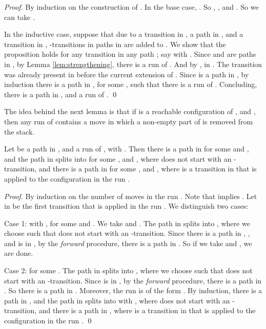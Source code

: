 \documentclass{llncs}
\begin{document}
\begin{proof}
By induction on the construction of .
In the base case, . So , ,  and .
So we can take .

In the inductive case, suppose that due to a transition  in , a path  in ,
and a transition  in ,
-transitions in paths  in  are added to .
We show that the proposition holds for any transition  in any path ;
say  with .
Since  and  are paths in , by Lemma \ref{lem:strengthening},
there is a run  of . And by ,  in .
The transition  was already present in  before the current extension of .
Since  is a path in , by induction there is a path  in , for some ,
such that there is a run  of .
Concluding, there is a path  in ,
and a run  of .
\qed
\end{proof}

The idea behind the next lemma is that if  is a reachable configuration of ,
and , then any run  of  contains a move
 in which a non-empty part  of  is removed from the stack.

\begin{lemma}
\label{lem:nfa3}
Let  be a path in , and
 a run of , with .
Then there is a path  in  for some  and , and
the path  in  splits into
 for some ,  and ,
where  does not start with an -transition, and
there is a path  in  for some ,  and ,
where  is a transition in 
that is applied to the configuration  in the run .
\end{lemma}

\begin{proof}
By induction on the number of moves in the run .
Note that  implies . Let  in 
be the first transition that is applied in the run . We distinguish two cases:

\vspace{1mm}

\noindent
{\sc Case 1}:  with , for some  and .
We take  and . The path  in  splits into
, where we choose  such that
 does not start with an -transition.
Since there is a path  in , ,
and  is in , by the {\em forward} procedure, there is a path  in .
So if we take  and , we are done.

\vspace{1mm}

\noindent
{\sc Case 2}:  for some . The path  in 
splits into , where we choose  such that
 does not start with an -transition.
Since  is in , by the {\em forward} procedure, there is a path  in .
So there is a path  in .
Moreover, the run  is of the form
.
By induction, there is a path  in ,
and the path  in  splits into 
with ,
where  does not start with an -transition, and
there is a path  in ,
where  is a transition in  that is applied to the configuration 
in the run .
\qed
\end{proof}
\end{document}
